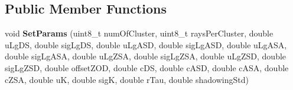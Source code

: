 \subsection*{Public Member Functions}
\begin{DoxyCompactItemize}
\item 
\mbox{\label{structns3_1_1millicar_1_1ParamsTable_a530c30ffafcba89117eba9fb42c91f58}} 
void {\bfseries Set\+Params} (uint8\+\_\+t num\+Of\+Cluster, uint8\+\_\+t rays\+Per\+Cluster, double u\+Lg\+DS, double sig\+Lg\+DS, double u\+Lg\+A\+SD, double sig\+Lg\+A\+SD, double u\+Lg\+A\+SA, double sig\+Lg\+A\+SA, double u\+Lg\+Z\+SA, double sig\+Lg\+Z\+SA, double u\+Lg\+Z\+SD, double sig\+Lg\+Z\+SD, double offset\+Z\+OD, double c\+DS, double c\+A\+SD, double c\+A\+SA, double c\+Z\+SA, double uK, double sigK, double r\+Tau, double shadowing\+Std)
\end{DoxyCompactItemize}
